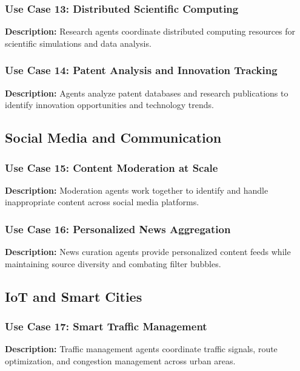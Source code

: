 \documentclass[12pt,a4paper]{article}
\begin{document}
\subsubsection{Use Case 13: Distributed Scientific Computing}

\textbf{Description:} Research agents coordinate distributed computing resources for scientific simulations and data analysis.

\subsubsection{Use Case 14: Patent Analysis and Innovation Tracking}

\textbf{Description:} Agents analyze patent databases and research publications to identify innovation opportunities and technology trends.

\subsection{Social Media and Communication}

\subsubsection{Use Case 15: Content Moderation at Scale}

\textbf{Description:} Moderation agents work together to identify and handle inappropriate content across social media platforms.

\subsubsection{Use Case 16: Personalized News Aggregation}

\textbf{Description:} News curation agents provide personalized content feeds while maintaining source diversity and combating filter bubbles.

\subsection{IoT and Smart Cities}

\subsubsection{Use Case 17: Smart Traffic Management}

\textbf{Description:} Traffic management agents coordinate traffic signals, route optimization, and congestion management across urban areas.
\end{document}
